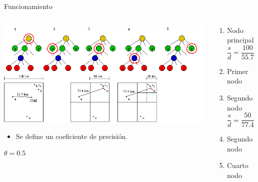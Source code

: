 \documentclass{beamer}
\begin{document}
\begin{frame}{Funcionamiento}
	\begin{columns}
		\begin{column}{0.6\textwidth}
			\centering
			\includegraphics[width=\linewidth]{sources/images/force.png}\\
			\begin{itemize}
				\item Se define un coeficiente de precisi\'on.
			\end{itemize}
			$\theta = 0.5$
			\pause
		\vspace{1cm}
		
		\end{column}
		\begin{column}{0.4\textwidth}
			\begin{enumerate}
				\footnotesize
				\item {\color{orange} Nodo principal} \pause
				\begin{equation*}
					\dfrac{s}{d} = \dfrac{100}{55.7} \approx 1.8 > \theta 
				\end{equation*}
				\pause
				\item {\color{green} Primer nodo} \pause
				\item {\color{green} Segundo nodo} \pause
				\begin{equation*}
					\dfrac{s}{d} = \dfrac{50}{77.4} \approx 0.6 > \theta 
				\end{equation*}
				\pause
				\item {\color{blue} Segundo nodo} \pause
				\pause
				\item {\color{green} Cuarto nodo} \pause
			\end{enumerate}
		\end{column}
	\end{columns}
\end{frame}
\end{document}
